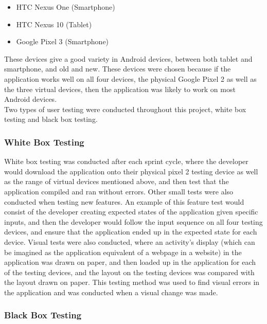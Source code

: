 \documentclass{article}
\begin{document}
\begin{itemize}
	\item HTC Nexus One (Smartphone)
	\item HTC Nexus 10 (Tablet)
	\item Google Pixel 3 (Smartphone)
\end{itemize}

These devices give a good variety in Android devices, between both tablet and smartphone, and old and new. These devices were chosen because if the application works well on all four devices, the physical Google Pixel 2 as well as the three virtual devices, then the application was likely to work on most Android devices. \\

Two types of user testing were conducted throughout this project, white box testing and black box testing. \\ 

\subsubsection{White Box Testing}

White box testing was conducted after each sprint cycle, where the developer would download the application onto their physical pixel 2 testing device as well as the range of virtual devices mentioned above, and then test that the application compiled and ran without errors. Other small tests were also conducted when testing new features. An example of this feature test would consist of the developer creating expected states of the application given specific inputs, and then the developer would follow the input sequence on all four testing devices, and ensure that the application ended up in the expected state for each device. Visual tests were also conducted, where an activity's display (which can be imagined as the application equivalent of a webpage in a website) in the application was drawn on paper, and then loaded up in the application for each of the testing devices, and the layout on the testing devices was compared with the layout drawn on paper. This testing method was used to find visual errors in the application and was conducted when a visual change was made. \\

\subsubsection{Black Box Testing}
\end{document}
